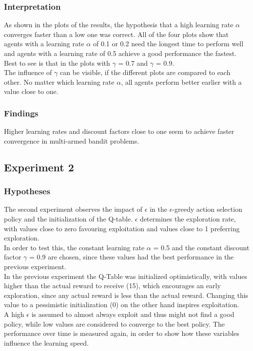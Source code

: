 \documentclass[11pt]{article}
\begin{document}
\subsubsection{Interpretation}
As shown in the plots of the results, the hypothesis that a high learning rate $\alpha$ converges faster than a low one was correct. All of the four plots show that agents with a learning rate $\alpha$ of 0.1 or 0.2 need the longest time to perform well and agents with a learning rate of 0.5 achieve a good performance the fastest. Best to see is that in the plots with $\gamma$ = 0.7 and $\gamma$ = 0.9.\\
The influence of $\gamma$ can be visible, if the different plots are compared to each other. No matter which learning rate $\alpha$, all agents perform better earlier with a value close to one.

\subsubsection{Findings}
Higher learning rates and discount factors close to one seem to achieve faster convergence in multi-armed bandit problems.


\subsection{Experiment 2}

\subsubsection{Hypotheses}
The second experiment observes the impact of $\epsilon$ in the $\epsilon$-greedy action selection policy and the initialization of the Q-table. $\epsilon$ determines the exploration rate, with values close to zero favouring exploitation and values close to 1 preferring exploration.\\
In order to test this, the constant learning rate $\alpha$ = 0.5 and the constant discount factor $\gamma$ = 0.9 are chosen, since these values had the best performance in the previous experiment.\\
In the previous experiment the Q-Table was initialized optimistically, with values higher than the actual reward to receive (15), which encourages an early exploration, since any actual reward is less than the actual reward. Changing this value to a pessimistic initialization (0) on the other hand inspires exploitation.\\
A high $\epsilon$ is assumed to almost always exploit and thus might not find a good policy, while low values are considered to converge to the best policy.
The performance over time is measured again, in order to show how these variables influence the learning speed.
\end{document}
